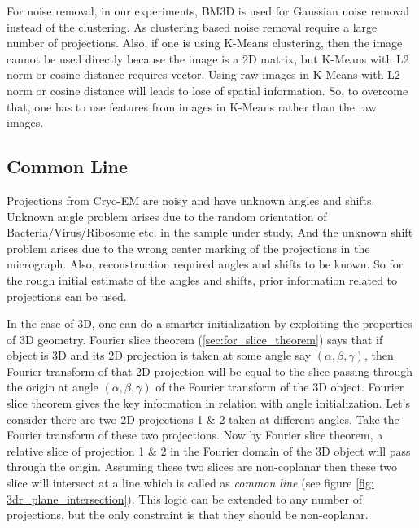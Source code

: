 \documentclass[twoside]{iitbreport}
\begin{document}
For noise removal, in our experiments, BM3D is used for Gaussian noise removal instead of the clustering. As clustering based noise removal require a large number of projections. Also, if one is using K-Means clustering, then the image cannot be used directly because the image is a 2D matrix, but K-Means with L2 norm or cosine distance requires vector. Using raw images in K-Means with L2 norm or cosine distance will leads to lose of spatial information.  So, to overcome that, one has to use features from images in K-Means rather than the raw images.

\subsection{Common Line}

Projections from Cryo-EM are noisy and have unknown angles and shifts. Unknown angle problem arises due to the random orientation of Bacteria/Virus/Ribosome etc. in the sample under study. And the unknown shift problem arises due to the wrong center marking of the projections in the micrograph. Also, reconstruction required angles and shifts to be known. So for the rough initial estimate of the angles and shifts, prior information related to projections can be used. 

In the case of 3D, one can do a smarter initialization by exploiting the properties of 3D geometry. Fourier slice theorem (\ref{sec:for_slice_theorem}) says that if object is 3D and its 2D projection is taken at some angle say $(\alpha,\beta,\gamma)$, then Fourier transform of that 2D projection will be equal to the slice passing through the origin  at angle $(\alpha,\beta,\gamma)$ of the Fourier transform of the 3D object. Fourier slice theorem gives the key information in relation with angle initialization. Let's consider there are two 2D projections 1 \& 2 taken at different angles. Take the Fourier transform of these two projections. Now by Fourier slice theorem, a relative slice of projection 1 \& 2 in the Fourier domain of the 3D object will pass through the origin. Assuming these two slices are non-coplanar then these two slice will intersect at a line which is called as \textit{common line} \cite{mallick2006structure} \cite{van1987angular} (see figure \ref{fig: 3dr_plane_intersection}). This logic can be extended to any number of projections, but the only constraint is that they should be non-coplanar. \\
\end{document}
